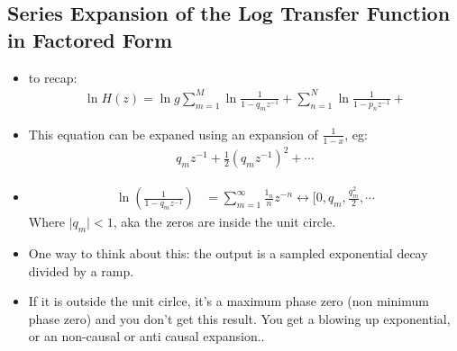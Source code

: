 \subsection*{Series Expansion of the Log Transfer Function in Factored Form}
\begin{itemize}
\item{
to recap:
\begin{align*}
\ln{H(z)} = \ln{g} 
\sum \limits_{m = 1}^{M} \ln {\frac{1}{1 - q_m z^{-1}}} +
\sum \limits_{n = 1}^{N} \ln {\frac{1}{1 - p_n z^{-1}}} +
\end{align*}
}
\item{
This equation can be expaned using an expansion of $\frac{1}{1 - x}$, eg:
\begin{align*}
q_m z^{-1} + \frac{1}{2}(q_m z^{-1})^2 + \cdots
\end{align*}
}
\item{
\begin{align*}
    \ln(\frac{1}{1 - q_m z^{-1}}) &= 
\sum\limits_{m = 1}^{\infty}  \frac{1_n}{n} z^{-n} \leftrightarrow 
\big[0, q_m, \frac{q_m^2}{2}, \cdots 
\end{align*}
    Where $\vert q_m \vert  < 1 $, aka the zeros are inside the unit circle.
}
\item{
    One way to think about this: the output is a sampled exponential decay divided by a ramp.
}
\item{
If it is outside the unit cirlce, it's a maximum phase zero (non minimum phase zero) 
and you don't get this result. You get a blowing up exponential, or an non-causal or
anti causal expansion..
}
\end{itemize}
